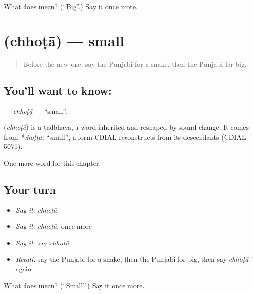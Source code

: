 \begin{tcolorbox}[breakable,colback=teal!4,colframe=teal!35!black,title={Before you move on}]
What does  mean? (\textquotedblleft{}Big\textquotedblright{}.) Say it once more.
\end{tcolorbox}
\section[\texorpdfstring{\pa{ਛੋਟਾ} (chhoṭā)}{ਛੋਟਾ (chhoṭā)}]{ (chhoṭā) — small}

\label{lesson:PA-C79-chhota}



\begin{quote}
Before the new one: say the Punjabi for a snake, then the Punjabi for big.
\end{quote}

\subsection*{You'll want to know: }
\textbf{} — \emph{chhoṭā} — \textquotedblleft{}small\textquotedblright{}.

\begin{cousinweb}
\textbf{} (\emph{chhoṭā}) is a tadbhava, a word inherited and reshaped by sound change. It comes from \emph{*choṭṭa}, \textquotedblleft{}small\textquotedblright{}, a form CDIAL reconstructs from its descendants (CDIAL 5071).
\end{cousinweb}

\begin{grammarlens}[title={What you've built}]
One more word for this chapter.
\end{grammarlens}

\subsection*{Your turn}
\begin{itemize}
\raggedright
  \item \emph{Say it:} \emph{chhoṭā}
  \item \emph{Say it:} \emph{chhoṭā}, once more
  \item \emph{Say it:} say \emph{chhoṭā}
  \item \emph{Recall:} say the Punjabi for a snake, then the Punjabi for big, then say \emph{chhoṭā} again
\end{itemize}

\begin{tcolorbox}[breakable,colback=teal!4,colframe=teal!35!black,title={Before you move on}]
What does  mean? (\textquotedblleft{}Small\textquotedblright{}.) Say it once more.
\end{tcolorbox}
